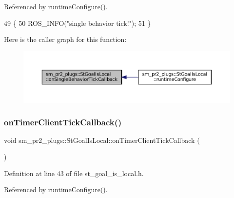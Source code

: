 Referenced by runtime\+Configure().


\begin{DoxyCode}
49     \{
50         ROS\_INFO(\textcolor{stringliteral}{"single behavior tick!"});
51     \}
\end{DoxyCode}
Here is the caller graph for this function\+:
\nopagebreak
\begin{figure}[H]
\begin{center}
\leavevmode
\includegraphics[width=350pt]{structsm__pr2__plugs_1_1StGoalIsLocal_a4d5abf255b17a81fe4a758a07f502e7d_icgraph}
\end{center}
\end{figure}
\mbox{\label{structsm__pr2__plugs_1_1StGoalIsLocal_a3a851e3468f6b247139f16abd1b91af3}} 
\subsubsection{\texorpdfstring{on\+Timer\+Client\+Tick\+Callback()}{onTimerClientTickCallback()}}
{\footnotesize\ttfamily void sm\+\_\+pr2\+\_\+plugs\+::\+St\+Goal\+Is\+Local\+::on\+Timer\+Client\+Tick\+Callback (\begin{DoxyParamCaption}{ }\end{DoxyParamCaption})\hspace{0.3cm}{\ttfamily [inline]}}



Definition at line 43 of file st\+\_\+goal\+\_\+is\+\_\+local.\+h.



Referenced by runtime\+Configure().


